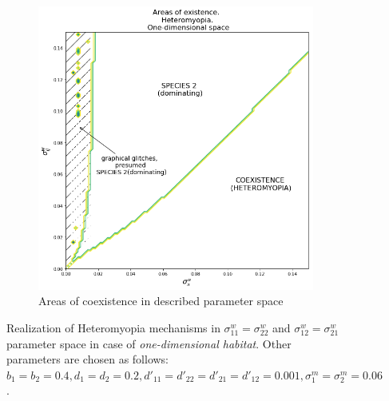 \documentclass[%
 aip,
rsi,%
 amsmath,amssymb,
 reprint,%
]{revtex4-1}
\begin{document}
\begin{figure}[ht]
\begin{subfigure}{.5\textwidth}
		\includegraphics[width=.93\linewidth]{arhm08d1.png}
		\caption{Areas of coexistence in described parameter space} 
		\label{fig:hmd1:sub2}
	\end{subfigure}
	\caption{Realization of Heteromyopia mechanisms in  $\sigma_{11}^{w}=\sigma_{22}^{w}$ and $\sigma_{12}^{w}=\sigma_{21}^{w}$ parameter space in case of \emph{one-dimensional habitat}. Other parameters are chosen as follows: $b_{1}=b_{2}=0.4
		, d_{1}=d_{2}=0.2
		, d'_{11}=d'_{22}=d'_{21}=d'_{12}=0.001,
		\sigma_{1}^{m}=\sigma_{2}^{m}=0.06$. }
	\label{fig:hmd1}
\end{figure}
\end{document}
